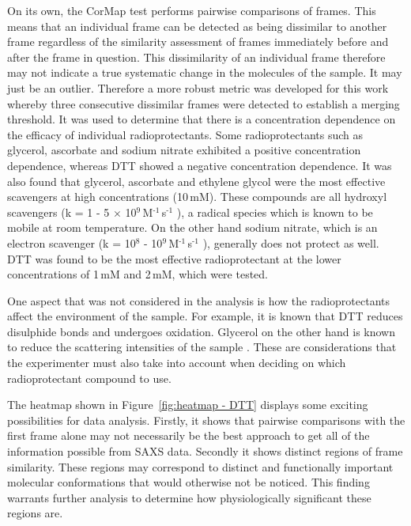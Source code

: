 On its own, the CorMap test performs pairwise comparisons of frames.
This means that an individual frame can be detected as being dissimilar to another frame regardless of the similarity assessment of frames immediately before and after the frame in question.
This dissimilarity of an individual frame therefore may not indicate a true systematic change in the molecules of the sample.
It may just be an outlier.
Therefore a more robust metric was developed for this work whereby three consecutive dissimilar frames were detected to establish a merging threshold.
It was used to determine that there is a concentration dependence on the efficacy of individual radioprotectants. Some radioprotectants such as glycerol, ascorbate and sodium nitrate exhibited a positive concentration dependence, whereas DTT showed a negative concentration dependence.
It was also found that glycerol, ascorbate and ethylene glycol were the most effective scavengers at high concentrations (10$\,$mM).
These compounds are all hydroxyl scavengers (k = 1 - 5 $\times$ 10$^{\text{9}}\,$M$^{\text{-1}}\,$s$^{\text{-1}}$ \cite{garrison1987reaction}), a radical species which is known to be mobile at room temperature.
On the other hand sodium nitrate, which is an electron scavenger (k = 10$^{\text{8}}$ -  10$^{\text{9}}\,$M$^{\text{-1}}\,$s$^{\text{-1}}$ \cite{garrison1987reaction,allan2012}), generally does not protect as well.
DTT was found to be the most effective radioprotectant at the lower concentrations of 1$\,$mM and 2$\,$mM, which were tested.

One aspect that was not considered in the analysis is how the radioprotectants affect the environment of the sample.
For example, it is known that DTT reduces disulphide bonds and undergoes oxidation.
Glycerol on the other hand is known to reduce the scattering intensities of the sample \cite{jeffries2015limiting}.
These are considerations that the experimenter must also take into account when deciding on which radioprotectant compound to use.

The heatmap shown in Figure~\ref{fig:heatmap - DTT} displays some exciting possibilities for data analysis.
Firstly, it shows that pairwise comparisons with the first frame alone may not necessarily be the best approach to get all of the information possible from SAXS data.
Secondly it shows distinct regions of frame similarity.
These regions may correspond to distinct and functionally important molecular conformations that would otherwise not be noticed.
This finding warrants further analysis to determine how physiologically significant these regions are.
